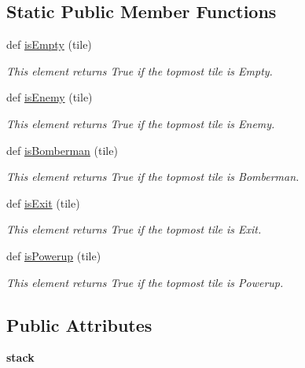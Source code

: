 \subsection*{Static Public Member Functions}
\begin{DoxyCompactItemize}
\item 
def \hyperlink{classsrc_1_1tile_1_1_tile_a402644908c005daf8f452078a8498884}{is\+Empty} (tile)
\begin{DoxyCompactList}\small\item\em This element returns True if the topmost tile is Empty. \end{DoxyCompactList}\item 
def \hyperlink{classsrc_1_1tile_1_1_tile_a26d5b3272e8b49c400420bfb80f2367e}{is\+Enemy} (tile)
\begin{DoxyCompactList}\small\item\em This element returns True if the topmost tile is Enemy. \end{DoxyCompactList}\item 
def \hyperlink{classsrc_1_1tile_1_1_tile_abe6a8c872f4e0d314bedb157c5d05f88}{is\+Bomberman} (tile)
\begin{DoxyCompactList}\small\item\em This element returns True if the topmost tile is Bomberman. \end{DoxyCompactList}\item 
def \hyperlink{classsrc_1_1tile_1_1_tile_a81e3ba4c45f3defa624c6d5cd080dab6}{is\+Exit} (tile)
\begin{DoxyCompactList}\small\item\em This element returns True if the topmost tile is Exit. \end{DoxyCompactList}\item 
def \hyperlink{classsrc_1_1tile_1_1_tile_a464b874776619a4388f7bc8a5a57eee1}{is\+Powerup} (tile)
\begin{DoxyCompactList}\small\item\em This element returns True if the topmost tile is Powerup. \end{DoxyCompactList}\end{DoxyCompactItemize}
\subsection*{Public Attributes}
\begin{DoxyCompactItemize}
\item 
\hypertarget{classsrc_1_1tile_1_1_tile_aaad193d1f0e1a1e90570e6069f65b330}{}{\bfseries stack}\label{classsrc_1_1tile_1_1_tile_aaad193d1f0e1a1e90570e6069f65b330}

\end{DoxyCompactItemize}
